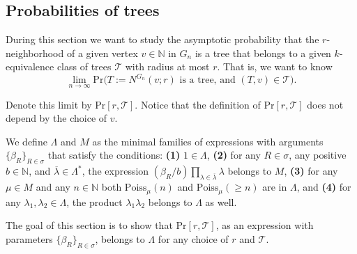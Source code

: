 \documentclass[12pt,notitlepage,a4paper]{article}
\theoremstyle{definition}
\newcommand{\N}{\mathbb{N}}
\newcommand{\Ln}{\lim\limits_{n\to \infty}}
\begin{document}
\subsection{Probabilities of trees}

During this section we want to study
the asymptotic probability that the 
$r$-neighborhood of a given vertex $v\in \N$
in $G_n$ 
is a tree that belongs to a given $k$-equivalence
class of trees $\mathcal{T}$ with radius at most
$r$. That is, we want to know
\[\Ln \mathrm{Pr}\big( 
T:=N^{G_n}(v;r) \text{ is a tree, and } (T,v)\in \mathcal{T} \big). 
\]

Denote this limit by $\mathrm{Pr}[r,\mathcal{T}]$. Notice that the 
definition of  $\mathrm{Pr}[r,\mathcal{T}]$ does not depend by the
choice of $v$.\par

We define $\Lambda$ and $M$ as the minimal families
of expressions with arguments $\{\beta_R\}_{R\in\sigma}$
that satisfy the conditions: \textbf{(1)}
$1\in \Lambda$, \textbf{(2)} 
for any $R\in \sigma$, any positive $b\in \N$,
and $\overline{\lambda} \in \Lambda^*$,
the expression $(\beta_R/b) \prod_{\lambda\in \overline{\lambda}}
\lambda$
belongs to $M$, \textbf{(3)}
for any $\mu\in M$ and any $n\in \N$ both
$\mathrm{Poiss}_{\mu}(n)$ and $\mathrm{Poiss}_\mu(\geq n)$ are in $\Lambda$, 
and  \textbf{(4)} for any $\lambda_1,\lambda_2 \in \Lambda$, the
product $\lambda_1\lambda_2$ belongs to $\Lambda$ as well.
\par
The goal of this section is to show 
that $\mathrm{Pr}[r,\mathcal{T}]$,
as an expression with parameters
$\{\beta_R\}_{R\in\sigma}$, belongs to $\Lambda$ for any choice of 
$r$ and $\mathcal{T}$. \par
\end{document}
